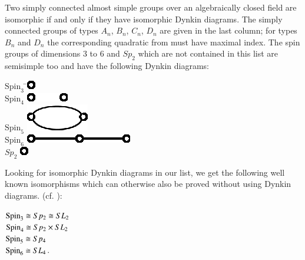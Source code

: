 Two simply connected almost simple groups over an algebraically closed
field are isomorphic if and only if they have isomorphic Dynkin
diagrams. The simply connected groups of types $A_n$, $B_n$, $C_n$, $D_n$
are given in the last column; for types $B_n$ and $D_n$ the
corresponding quadra\-tic from must have maximal index. The spin groups
of dimensions 3 to 6 and $Sp_2$ which are not contained in this
list are semisimple too and have the following Dynkin diagrams:    

\begin{center}
\begin{tabbing}
\; $\text{Spin}_3$ \=  \qquad \includegraphics{figures/fig10.eps}\\[5pt] 
\; $\text{Spin}_4$ \> \qquad \includegraphics{figures/fig11.eps}\\[5pt] 
\; $\text{Spin}_5$ \> \qquad \includegraphics{figures/fig12.eps}\\[5pt] 
\; $\text{Spin}_6$ \> \qquad \includegraphics{figures/fig13.eps}\\[5pt] 
\; $Sp_2$ \>  \qquad \includegraphics{figures/fig10.eps}
\end{tabbing}\pageoriginale
\end{center}

Looking for isomorphic Dynkin diagrams in our list, we get the
following well known isomorphisms which can otherwise also be proved
without using Dynkin diagrams. (cf. \cite{keyDi}):  

$ \operatorname{Spin}_3  \cong Sp_2 \cong SL_2$ \\

$\operatorname{Spin}_4  \cong Sp_2 \times SL_2$ \\

$ \operatorname{Spin}_5  \cong Sp_4 $ \\

$\operatorname{Spin}_6  \cong SL_4$. \\

